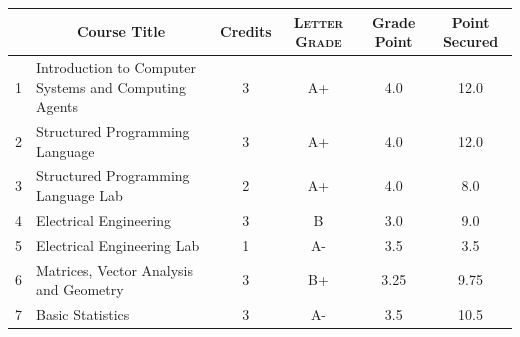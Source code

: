 \documentclass[11pt]{article}
\newcommand*{\numtwo}[1]{\pgfmathprintnumber[
                    fixed, precision=2, fixed zerofill=true]{#1}}
\begin{document}
                \begin{center}
                    \renewcommand{\arraystretch}{1.08}
                    
                \begin{tabular}{|c|l|c|>{\scshape}c|c|c|}
                \hline  \rule[-1ex]{0pt}{3.5ex} {\centering{\bf Course Code}} &  \multicolumn{1}{c|}{\textbf{Course Title}}  & {\bf Credits} & {\bf Letter Grade} & {\bf Grade Point} & {\bf Point Secured}  \\ 
                \hline   1 &  Introduction to Computer Systems and Computing Agents		 & 3 & A+ & 4.0 & 12.0 \\ %
                \hline   2 &  Structured Programming Language		 & 3 & A+ & 4.0 & 12.0 \\ %
                \hline   3 &  Structured Programming Language Lab		 & 2 & A+ & 4.0 & 8.0 \\ %
                \hline   4 &  Electrical Engineering		 & 3 & B & 3.0 & 9.0 \\ %
                \hline   5 &  Electrical Engineering Lab		 & 1 & A- & 3.5 & 3.5 \\ %
                \hline   6 &  Matrices, Vector Analysis and Geometry		 & 3 & B+ & 3.25 & 9.75 \\ %
                \hline   7 &  Basic Statistics		 & 3 & A- & 3.5 & 10.5 \\ %

\hline                %
                \end{tabular}
                \end{center}
                \renewcommand{\arraystretch}{1.03}
\end{document}
